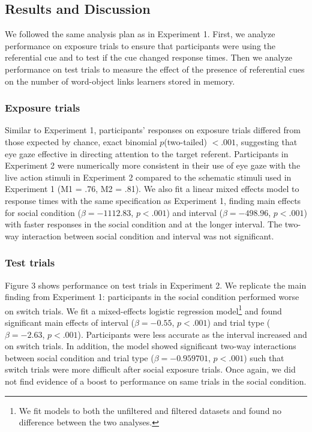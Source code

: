 \documentclass[10pt,letterpaper]{article}
\begin{document}
\subsection{Results and Discussion}

We followed the same analysis plan as in Experiment 1. First, we analyze performance on exposure trials to ensure that participants were using the referential cue and to test if the cue changed response times. Then we analyze performance on test trials to measure the effect of  the presence of referential cues on the number of word-object links learners stored in memory.

\subsubsection{Exposure trials}

Similar to Experiment 1, participants' responses on exposure trials differed from those expected by chance, exact binomial $p$(two-tailed) $< .001$, suggesting that eye gaze effective in directing attention to the target referent. Participants in Experiment 2 were numerically more consistent in their use of eye gaze with the live action stimuli in Experiment 2 compared to the schematic stimuli used in Experiment 1 (M1 = .76, M2 = .81). We also fit a linear mixed effects  model to response times with the same specification as Experiment 1, finding main effects for social condition ($\beta= -1112.83$, $p< .001$) and interval ($\beta=  -498.96 $, $p< .001$) with faster responses in the social condition and at the longer interval. The two-way interaction between social condition and interval was not significant.

\subsubsection{Test trials}

Figure 3 shows performance on test trials in Experiment 2. We replicate the main finding from Experiment 1: participants in the social condition performed worse on switch trials. We fit a mixed-effects logistic regression model\footnote{We fit models to both the unfiltered and filtered datasets and found no difference between the two analyses.} and found significant main effects of interval ($\beta=  -0.55$, $p< .001$) and trial type ($\beta=  -2.63$, $p< .001$). Participants were less accurate as the interval increased and on switch trials. In addition, the model showed significant two-way interactions between social condition and trial type ($\beta=  -0.959701$, $p< .001$) such that switch trials were more difficult after social exposure trials. Once again, we did not find evidence of a boost to performance on same trials in the social condition. 
\end{document}
